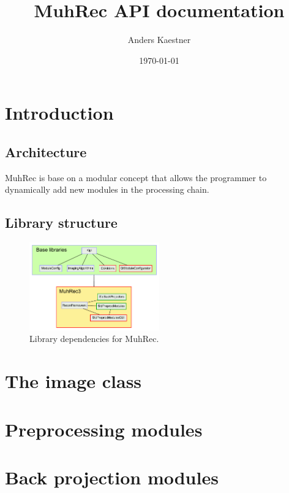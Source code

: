 \documentclass[11pt,a4paper]{article}
\author{Anders Kaestner}
\title{MuhRec API documentation}
\date{\today}
\begin{document}
\maketitle
\section{Introduction}
\subsection{Architecture}
MuhRec is base on a modular concept that allows the programmer to dynamically add new modules in the processing chain. 
\subsection{Library structure}
\begin{figure}
\centering
\includegraphics[width=0.5\textwidth]{figures/KiplComponents.pdf}
\caption{Library dependencies for MuhRec.}
\end{figure}
\section{The image class}
\section{Preprocessing modules}
\section{Back projection modules}
\end{document}
